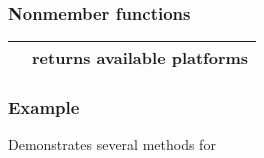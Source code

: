 \documentclass[letterpaper,10pt,english]{sphinxmanual}
\begin{document}
\subsubsection*{Non\sphinxhyphen{}member functions}


\begin{savenotes}\sphinxattablestart
\centering
\begin{tabulary}{\linewidth}[t]{|T|T|}
\hline

{\hyperref[\detokenize{programming-interface/runtime/platform:get-platforms}]{}}
&
returns available platforms
\\
\hline
\end{tabulary}
\par
\sphinxattableend\end{savenotes}
\label{\detokenize{programming-interface/runtime/platform:platform-example}}\subsubsection*{Example}

Demonstrates several methods for 
\end{document}
